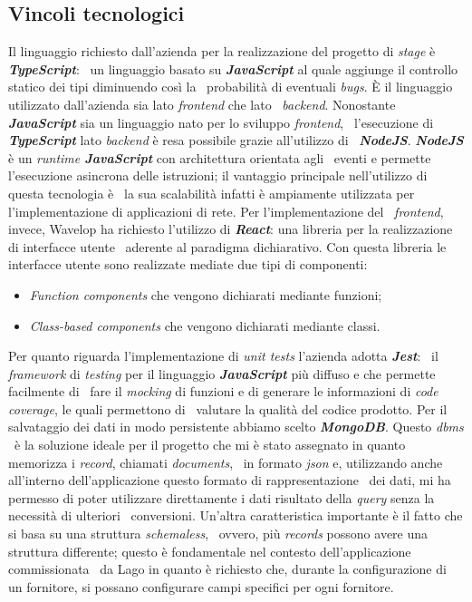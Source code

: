 \subsection{Vincoli tecnologici}
Il linguaggio richiesto dall'azienda per la realizzazione del progetto di \emph{stage} è \emph{\textbf{TypeScript}}: \
un linguaggio basato su \emph{\textbf{JavaScript}} al quale aggiunge il controllo statico dei tipi diminuendo così la \
probabilità di eventuali \emph{bugs}. È il linguaggio utilizzato dall'azienda sia lato \emph{\gls{frontend}} che lato \
\emph{\gls{backend}}. Nonostante \emph{\textbf{JavaScript}} sia un linguaggio nato per lo sviluppo \emph{frontend}, \
l'esecuzione di \emph{\textbf{TypeScript}} lato \emph{backend} è resa possibile grazie all'utilizzo di \
\emph{\textbf{NodeJS}}. \emph{\textbf{NodeJS}} è un \emph{runtime \textbf{JavaScript}} con architettura orientata agli \
eventi e permette l'esecuzione asincrona delle istruzioni; il vantaggio principale nell'utilizzo di questa tecnologia è \
la sua scalabilità infatti è ampiamente utilizzata per l'implementazione di applicazioni di rete. Per l'implementazione del \
\emph{frontend}, invece, Wavelop ha richiesto l'utilizzo di \emph{\textbf{React}}: una libreria per la realizzazione di interfacce utente \
aderente al paradigma dichiarativo. Con questa libreria le interfacce utente sono realizzate mediate due tipi di componenti: \
\begin{itemize}
  \item \emph{Function components} che vengono dichiarati mediante funzioni;
  \item \emph{Class-based components} che vengono dichiarati mediante classi.
\end{itemize}
Per quanto riguarda l'implementazione di \emph{unit tests} l'azienda adotta \emph{\textbf{Jest}}: \
il \emph{framework} di \emph{testing} per il linguaggio \emph{\textbf{JavaScript}} più diffuso e che permette facilmente di \
fare il \emph{mocking} di funzioni e di generare le informazioni di \emph{code coverage}, le quali permettono di \
valutare la qualità del codice prodotto.
Per il salvataggio dei dati in modo persistente abbiamo scelto \emph{\textbf{MongoDB}}. Questo \emph{\acrshort{dbms}} \
è la soluzione ideale per il progetto che mi è stato assegnato in quanto memorizza i \emph{record}, chiamati \emph{documents}, \
in formato \emph{\acrshort{json}} e, utilizzando anche all'interno dell'applicazione questo formato di rappresentazione \
dei dati, mi ha permesso di poter utilizzare direttamente i dati risultato della \emph{query} senza la necessità di ulteriori \
conversioni. Un'altra caratteristica importante è il fatto che si basa su una struttura \emph{schemaless}, \
ovvero, più \emph{records} possono avere una struttura differente; questo è fondamentale nel contesto dell'applicazione commissionata \
da Lago in quanto è richiesto che, durante la configurazione di un fornitore, si possano configurare campi specifici per ogni fornitore.

